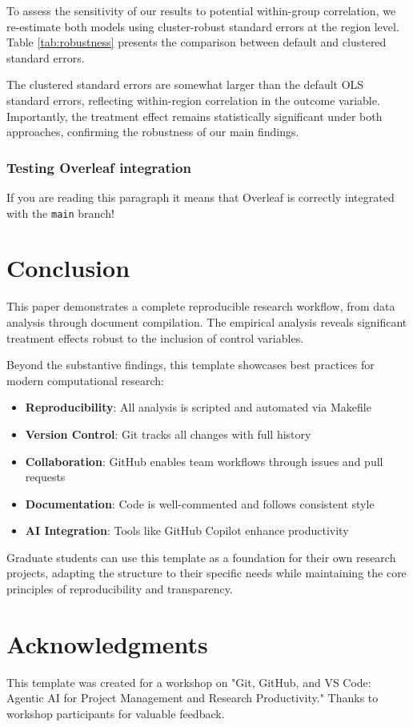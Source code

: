 \documentclass[11pt,letterpaper]{article}
\begin{document}
To assess the sensitivity of our results to potential within-group correlation, we re-estimate both models using cluster-robust standard errors at the region level. Table \ref{tab:robustness} presents the comparison between default and clustered standard errors.



The clustered standard errors are somewhat larger than the default OLS standard errors, reflecting within-region correlation in the outcome variable. Importantly, the treatment effect remains statistically significant under both approaches, confirming the robustness of our main findings.

\subsubsection{Testing Overleaf integration}

If you are reading this paragraph it means that Overleaf is correctly integrated with the \texttt{main} branch!

\section{Conclusion}
\label{sec:conclusion}

This paper demonstrates a complete reproducible research workflow, from data analysis through document compilation. The empirical analysis reveals significant treatment effects robust to the inclusion of control variables.

Beyond the substantive findings, this template showcases best practices for modern computational research:

\begin{itemize}
    \item \textbf{Reproducibility}: All analysis is scripted and automated via Makefile
    \item \textbf{Version Control}: Git tracks all changes with full history
    \item \textbf{Collaboration}: GitHub enables team workflows through issues and pull requests
    \item \textbf{Documentation}: Code is well-commented and follows consistent style
    \item \textbf{AI Integration}: Tools like GitHub Copilot enhance productivity
\end{itemize}

Graduate students can use this template as a foundation for their own research projects, adapting the structure to their specific needs while maintaining the core principles of reproducibility and transparency.

\section*{Acknowledgments}

This template was created for a workshop on "Git, GitHub, and VS Code: Agentic AI for Project Management and Research Productivity." Thanks to workshop participants for valuable feedback.



\end{document}

